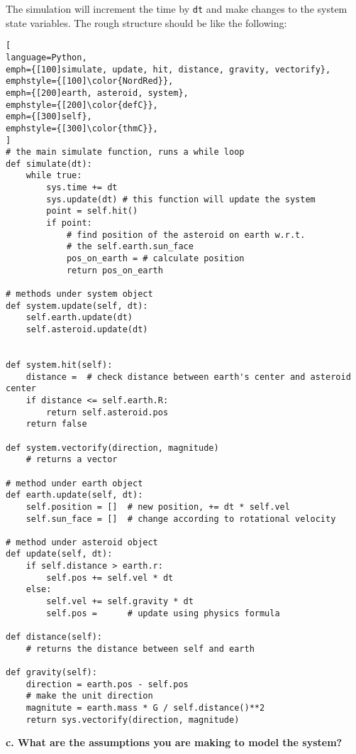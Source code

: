 \documentclass[article, 12pt, a4paper]{memoir}
\begin{document}
\begin{solution}
    The simulation will increment the time by \texttt{dt} and make changes to the system
    state variables. The rough structure should be like the following:

\begin{lstlisting}[
language=Python,
emph={[100]simulate, update, hit, distance, gravity, vectorify},
emphstyle={[100]\color{NordRed}},
emph={[200]earth, asteroid, system},
emphstyle={[200]\color{defC}},
emph={[300]self},
emphstyle={[300]\color{thmC}},
]
# the main simulate function, runs a while loop
def simulate(dt):
    while true:
        sys.time += dt
        sys.update(dt) # this function will update the system
        point = self.hit()
        if point:
            # find position of the asteroid on earth w.r.t. 
            # the self.earth.sun_face
            pos_on_earth = # calculate position
            return pos_on_earth

# methods under system object
def system.update(self, dt):
    self.earth.update(dt)
    self.asteroid.update(dt)


def system.hit(self):
    distance =  # check distance between earth's center and asteroid center
    if distance <= self.earth.R:
        return self.asteroid.pos
    return false

def system.vectorify(direction, magnitude)
    # returns a vector

# method under earth object
def earth.update(self, dt):
    self.position = []  # new position, += dt * self.vel
    self.sun_face = []  # change according to rotational velocity

# method under asteroid object
def update(self, dt):
    if self.distance > earth.r:
        self.pos += self.vel * dt
    else:
        self.vel += self.gravity * dt
        self.pos =      # update using physics formula

def distance(self):
    # returns the distance between self and earth

def gravity(self):
    direction = earth.pos - self.pos 
    # make the unit direction
    magnitute = earth.mass * G / self.distance()**2
    return sys.vectorify(direction, magnitude)
\end{lstlisting}
\end{solution}

\textbf{c. What are the assumptions you are making to model the system?}
\vspace{1em}
\end{document}
